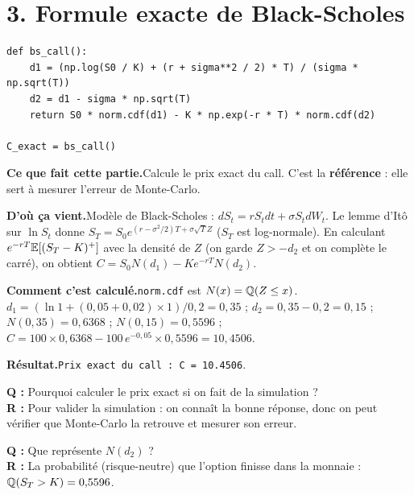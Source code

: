 \documentclass[11pt,a4paper]{article}
\newcommand{\quoi}[1]{\par\noindent\textbf{\color{bleu}Ce que fait cette partie.}\enspace #1\par}
\newcommand{\source}[1]{\par\noindent\textbf{\color{orange}D'où ça vient.}\enspace #1\par}
\newcommand{\calcul}[1]{\par\noindent\textbf{\color{bleu}Comment c'est calculé.}\enspace #1\par}
\newcommand{\resultat}[1]{\par\noindent\textbf{\color{vert}Résultat.}\enspace #1\par}
\newcommand{\prof}[2]{\begin{tcolorbox}[colback=orange!6,colframe=orange!80,boxrule=0.4pt,arc=2pt,left=5pt,right=5pt,top=2pt,bottom=2pt]\small\textbf{Q :} #1\\[1pt]\textbf{R :} #2\end{tcolorbox}}
\newcommand{\sect}[1]{\clearpage\section{#1}}
\begin{document}
\sect{3. Formule exacte de Black-Scholes}
\begin{lstlisting}
def bs_call():
    d1 = (np.log(S0 / K) + (r + sigma**2 / 2) * T) / (sigma * np.sqrt(T))
    d2 = d1 - sigma * np.sqrt(T)
    return S0 * norm.cdf(d1) - K * np.exp(-r * T) * norm.cdf(d2)

C_exact = bs_call()
\end{lstlisting}
\quoi{Calcule le prix exact du call. C'est la \textbf{référence} : elle sert à mesurer l'erreur de Monte-Carlo.}
\source{Modèle de Black-Scholes : $dS_t = rS_tdt + \sigma S_tdW_t$. Le lemme d'Itô sur $\ln S_t$ donne $S_T = S_0e^{(r-\sigma^2/2)T+\sigma\sqrt TZ}$ ($S_T$ est log-normale). En calculant $e^{-rT}\mathbb{E}[(S_T-K)^+]$ avec la densité de $Z$ (on garde $Z>-d_2$ et on complète le carré), on obtient
$C = S_0N(d_1) - Ke^{-rT}N(d_2)$.}
\calcul{\texttt{norm.cdf} est $N(x) = \mathbb{Q}(Z\le x)$.
$d_1 = (\ln1 + (0{,}05+0{,}02)\times1)/0{,}2 = 0{,}35$ ; $d_2 = 0{,}35-0{,}2 = 0{,}15$ ;
$N(0{,}35) = 0{,}6368$ ; $N(0{,}15) = 0{,}5596$ ;
$C = 100\times0{,}6368 - 100\,e^{-0{,}05}\times0{,}5596 = 10{,}4506$.}
\resultat{\texttt{Prix exact du call : C = 10.4506}.}
\prof{Pourquoi calculer le prix exact si on fait de la simulation ?}{Pour valider la simulation : on connaît la bonne réponse, donc on peut vérifier que Monte-Carlo la retrouve et mesurer son erreur.}
\prof{Que représente $N(d_2)$ ?}{La probabilité (risque-neutre) que l'option finisse dans la monnaie : $\mathbb{Q}(S_T>K) = 0{,}5596$.}
\end{document}
